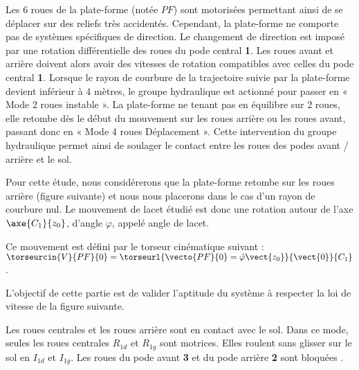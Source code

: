 Les 6 roues de la plate-forme (notée $PF$) sont motorisées permettant ainsi de se déplacer sur des reliefs très
accidentés. Cependant, la plate-forme ne comporte pas de systèmes spécifiques de direction. Le changement de
direction est imposé par une rotation différentielle des roues du pode central \textbf{1}. Les roues avant et arrière doivent alors
avoir des vitesses de rotation compatibles avec celles du pode central \textbf{1}. Lorsque le rayon de courbure de la trajectoire
suivie par la plate-forme devient inférieur à 4 mètres, le groupe hydraulique est actionné pour passer en « Mode 2
roues instable ». La plate-forme ne tenant pas en équilibre sur 2 roues, elle retombe dès le début du mouvement sur
les roues arrière ou les roues avant, passant donc en « Mode 4 roues Déplacement ». Cette intervention du groupe
hydraulique permet ainsi de soulager le contact entre les roues des podes avant / arrière et le sol. 

Pour cette étude, nous considérerons que la plate-forme retombe sur les roues arrière (figure suivante) et nous nous placerons dans le cas d’un rayon de courbure nul. Le mouvement de lacet étudié est donc une rotation autour de l’axe $\axe{C_1}{z_0}$, d’angle  $\varphi$, appelé angle de lacet.


Ce mouvement est défini par le torseur cinématique suivant : $\torseurcin{V}{PF}{0}=\torseurl{\vecto{PF}{0}=\dot{\varphi}\vect{z_0}}{\vect{0}}{C_1}$.





L’objectif de cette partie est de valider l’aptitude du système à respecter la
loi de vitesse de la figure suivante.



Les roues centrales et les roues arrière sont en contact avec le sol. Dans ce
mode, seules les roues centrales $R_{1d}$ et $R_{1g}$ sont motrices. Elles roulent
sans glisser sur le sol en $I_{1d}$ et $I_{1g}$. Les roues du pode avant \textbf{3} et du pode
arrière \textbf{2} sont bloquées .


